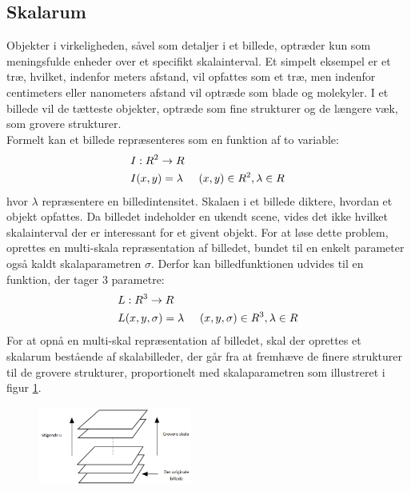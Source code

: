\subsection{Skalarum}
Objekter i virkeligheden, såvel som detaljer i et billede, optræder kun som meningsfulde enheder over et specifikt skalainterval. Et simpelt eksempel er et træ, hvilket, indenfor meters afstand, vil opfattes som et træ, men indenfor centimeters eller nanometers afstand vil optræde som blade og molekyler. I et billede vil de tætteste objekter, optræde som fine strukturer og de længere væk, som grovere strukturer. 
\\
Formelt kan et billede repræsenteres som en funktion af to variable:
\begin{equation}
\begin{split}
&I: R^2 \rightarrow R \\
&I(x,y) = \lambda \hspace{0.5 cm} (x,y)\in R^2, \lambda \in R
\end{split}
\end{equation}
hvor $\lambda$ repræsentere en billedintensitet. Skalaen i et billede diktere, hvordan et objekt opfattes. Da billedet indeholder en ukendt scene, vides det ikke hvilket skalainterval der er interessant for et givent objekt. For at løse dette problem, oprettes en multi-skala repræsentation af billedet, bundet til en enkelt parameter også kaldt skalaparametren $\sigma$. Derfor kan billedfunktionen udvides til en funktion, der tager 3 parametre:
\begin{equation}
\begin{split}
&L: R^3 \rightarrow R \\
&L(x,y,\sigma) = \lambda \hspace{0.5 cm} (x,y,\sigma)\in R^3, \lambda \in R
\end{split}
\end{equation}
For at opnå en multi-skal repræsentation af billedet, skal der oprettes et skalarum bestående af skalabilleder, der går fra at fremhæve de finere strukturer til de grovere strukturer, proportionelt med skalaparametren som illustreret i figur \ref{fig:scalerep}. 
\begin{figure}[H]
    \centering
    \includegraphics[width=0.45\textwidth]{fig/32.png}
     \vspace{-1em}
    \begin{center}    
       \caption{\textcolor{gray}{\footnotesize \textit{ }}}
    \label{fig:scalerep}
     \end{center}
     \vspace{-2.5em}
  \end{figure} \noindent
